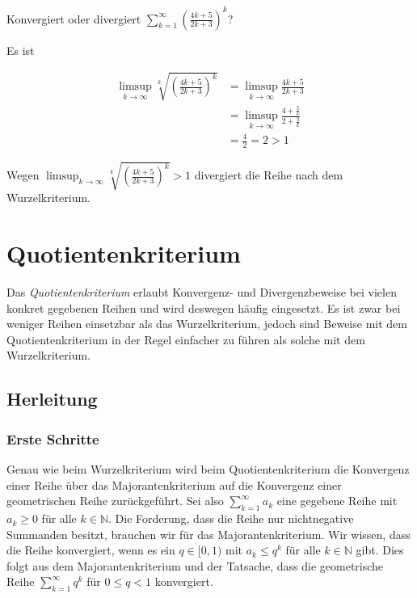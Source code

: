 \documentclass[fontsize=9pt,
               parskip=half-,
               DIV=14,
               listof=chapterentry,
               tocflat]{scrbook}
\begin{document}
\begin{exercise*}
Konvergiert oder divergiert $\sum _{k=1}^{\infty }\left({\frac {4k+5}{2k+3}}\right)^{k}$?

\end{exercise*}

\begin{solution*}
Es ist

\begin{align*}
\limsup _{k\to \infty }{\sqrt[{k}]{\left({\frac {4k+5}{2k+3}}\right)^{k}}}&=\limsup _{k\to \infty }{\frac {4k+5}{2k+3}}\\[0.5em]&=\limsup _{k\to \infty }{\frac {4+{\frac {5}{k}}}{2+{\frac {3}{k}}}}\\[0.5em]&={\frac {4}{2}}=2>1
\end{align*}

Wegen $\limsup _{k\to \infty }{\sqrt[{k}]{\left({\frac {4k+5}{2k+3}}\right)^{k}}}>1$ divergiert die Reihe nach dem Wurzelkriterium.

\end{solution*}


\chapter{Quotientenkriterium}

Das \emph{Quotientenkriterium} erlaubt Konvergenz- und Divergenzbeweise bei vielen konkret gegebenen Reihen und wird deswegen häufig eingesetzt. Es ist zwar bei weniger Reihen einsetzbar als das Wurzelkriterium, jedoch sind Beweise mit dem Quotientenkriterium in der Regel einfacher zu führen als solche mit dem Wurzelkriterium.



\section{Herleitung}

\subsection{Erste Schritte}

Genau wie beim Wurzelkriterium wird beim Quotientenkriterium die Konvergenz einer Reihe über das Majorantenkriterium auf die Konvergenz einer geometrischen Reihe zurückgeführt. Sei also $\sum _{k=1}^{\infty }a_{k}$ eine gegebene Reihe mit $a_{k}\geq 0$ für alle $k\in \mathbb {N} $. Die Forderung, dass die Reihe nur nichtnegative Summanden besitzt, brauchen wir für das Majorantenkriterium. Wir wissen, dass die Reihe konvergiert, wenn es ein $q\in [0,1)$ mit $a_{k}\leq q^{k}$ für alle $k\in \mathbb {N} $ gibt. Dies folgt aus dem Majorantenkriterium und der Tatsache, dass die geometrische Reihe $\sum _{k=1}^{\infty }q^{k}$ für $0\leq q<1$ konvergiert.
\end{document}

